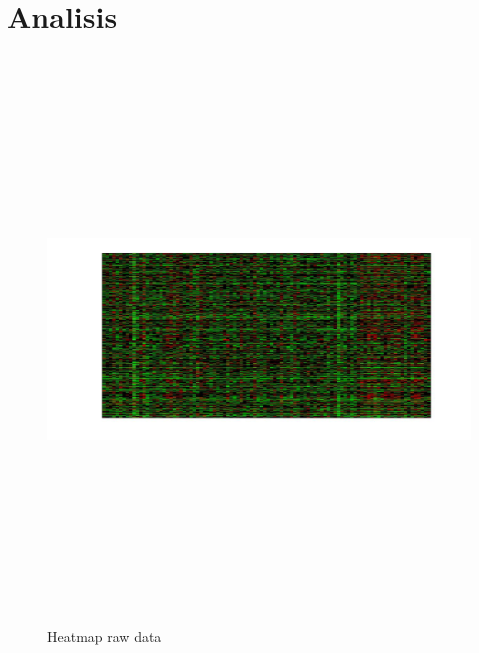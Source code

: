 \section{Analisis}

\begin{figure}[htbp]
	\centering
	\includegraphics[width=\linewidth,height=15cm,keepaspectratio]{analisis/raw.jpg}
	\caption{Heatmap raw data}
	\label{pic:raw}
\end{figure}

